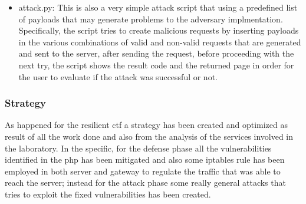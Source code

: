 \documentclass[14pt]{article}
\begin{document}
\begin{itemize}
	\item attack.py: This is also a very simple attack script that using a predefined list of payloads that may generate problems to the adversary implmentation. Specifically, the script tries to create malicious requests by inserting payloads in the various combinations of valid and non-valid requests that are generated and sent to the server, after sending the request, before proceeding with the next try, the script shows the result code and the returned page in order for the user to evaluate if the attack was successful or not.
\end{itemize}

\subsubsection{Strategy}
As happened for the resilient ctf a strategy has been created and optimized as result of all the work done and also from the analysis of the services involved in the laboratory. In the specific, for the defense phase all the vulnerabilities identified in the php has been mitigated and also some iptables rule has been employed in both server and gateway to regulate the traffic that was able to reach the server; instead for the attack phase some really general attacks that tries to exploit the fixed vulnerabilities has been created.
\end{document}
